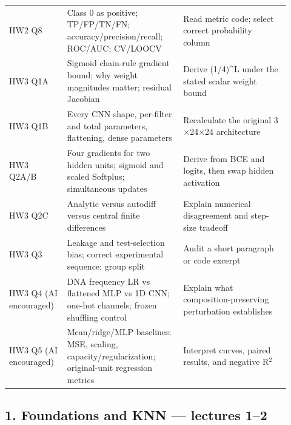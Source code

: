 \documentclass[11pt]{article}
\begin{document}
{\begin{longtable}{>{\raggedright\arraybackslash}p{0.19\linewidth}>{\raggedright\arraybackslash}p{0.38\linewidth}>{\raggedright\arraybackslash}p{0.35\linewidth}}
HW2 Q8 & Class 0 as positive; TP/\allowbreak{}FP/\allowbreak{}TN/\allowbreak{}FN; accuracy/\allowbreak{}precision/\allowbreak{}recall; ROC/\allowbreak{}AUC; CV/\allowbreak{}LOOCV & Read metric code; select correct probability column \\
HW3 Q1A & Sigmoid chain-rule gradient bound; why weight magnitudes matter; residual Jacobian & Derive (1/\allowbreak{}4)\textasciicircum{}L under the stated scalar weight bound \\
HW3 Q1B & Every CNN shape, per-filter and total parameters, flattening, dense parameters & Recalculate the original 3\ensuremath{\times}24\ensuremath{\times}24 architecture \\
HW3 Q2A/\allowbreak{}B & Four gradients for two hidden units; sigmoid and scaled Softplus; simultaneous updates & Derive from BCE and logits, then swap hidden activation \\
HW3 Q2C & Analytic versus autodiff versus central finite differences & Explain numerical disagreement and step-size tradeoff \\
HW3 Q3 & Leakage and test-selection bias; correct experimental sequence; group split & Audit a short paragraph or code excerpt \\
HW3 Q4 (AI encouraged) & DNA frequency LR vs flattened MLP vs 1D CNN; one-hot channels; frozen shuffling control & Explain what composition-preserving perturbation establishes \\
HW3 Q5 (AI encouraged) & Mean/\allowbreak{}ridge/\allowbreak{}MLP baselines; MSE, scaling, capacity/\allowbreak{}regularization; original-unit regression metrics & Interpret curves, paired results, and negative R\ensuremath{{}^2} \\
\bottomrule\end{longtable}}

\subsection*{1. Foundations and KNN — lectures 1–2}
\end{document}
